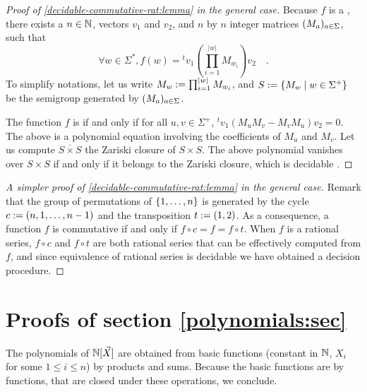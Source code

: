 \begin{proof}[Proof of \cref{decidable-commutative-rat:lemma} in the general case]
    Because $f$ is a ,
    there exists a $n \in \mathbb{N}$,
    vectors $v_1$ and $v_2$,
    and $n$ by $n$ integer matrices $(M_a)_{a \in \Sigma}$,
    such that
    \begin{equation*}
        \forall w \in \Sigma^*,
        f(w) = {}^t v_1 \left(\prod_{i = 1}^{|w|} M_{w_i}\right) v_2 \quad .
    \end{equation*}
    To simplify notations, 
    let us write $M_w \mathrel{:=} \prod_{i = 1}^{|w|} M_{w_i}$,
    and 
    $S \mathrel{:=} \mathopen{\{} M_w \mid w \in \Sigma^+ \mathclose{\}}$ be the
    semigroup generated by $(M_a)_{a \in \Sigma}$.

    The function $f$ is  if and only if for all $u,v \in
    \Sigma^+$, ${}^t v_1 (M_u M_v  - M_v M_u) v_2 = 0$. The above is a
    polynomial equation involving the coefficients of $M_u$ and $M_v$.
    Let us compute $\overline{S \times S}$ the Zariski closure of $S \times S$.
    The above polynomial vanishes over $S \times S$ if and only
    if it belongs to the Zariski closure, which is decidable
    \cite{HOPW18}.
\end{proof}

\begin{proof}[A simpler proof of \cref{decidable-commutative-rat:lemma} in the general case]
    Remark that the group of permutations of $\mathopen{\{} 1, \dots, n \mathclose{\}}$ is generated by
    the cycle $c \mathrel{:=} (n,1, \dots, n-1)$ and the transposition $t \mathrel{:=} (1, 2)$.
    As a consequence, a function $f$ is commutative if and only if
    $f \circ c = f = f \circ t$.
    When $f$ is a rational series,
    $f \circ c$ and $f \circ t$ are both rational series that can be
    effectively computed from $f$, and since equivalence
    of rational series is decidable 
    \cite{BERE10}
    we have obtained a decision procedure.
\end{proof}
    

\section{Proofs of section \ref{polynomials:sec}}


\begin{proofof}
    The polynomials of $\mathbb{N}[\vec{X}]$
    are obtained from basic functions (constant in $\mathbb{N}$,
    $X_i$ for some $1 \leq i \leq n$)
    by products and sums. Because the basic functions are
     by  functions,
    that are closed under these operations, we conclude.
\end{proofof}

